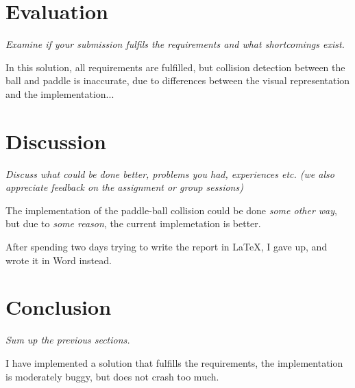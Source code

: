 \documentclass[11pt]{article}
\begin{document}
\section{Evaluation}

\emph{Examine if your submission fulfils the requirements and what shortcomings exist.}

In this solution, all requirements are fulfilled, but collision detection between the ball and paddle is inaccurate, due to differences between the visual representation and the implementation...

\section{Discussion}

\emph{Discuss what could be done better, problems you had, experiences etc. (we also appreciate feedback on the assignment or group sessions) }

The implementation of the paddle-ball collision could be done \emph{some other way}, but due to \emph{some reason}, the current implemetation is better.

After spending two days trying to write the report in \LaTeX, I gave up, and wrote it in Word instead.

\section{Conclusion}

\emph{Sum up the previous sections.}

I have implemented a solution that fulfills the requirements, the implementation is moderately buggy, but does not crash too much.




\end{document}
